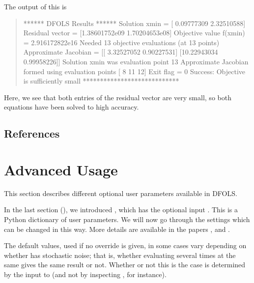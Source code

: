 \documentclass[letterpaper,10pt,english]{sphinxmanual}
\begin{document}
\sphinxAtStartPar
The output of this is
\begin{quote}

\begin{sphinxVerbatim}[commandchars=\\\{\}]
****** DFO\PYGZhy{}LS Results ******
Solution xmin = [ 0.09777309 \PYGZhy{}2.32510588]
Residual vector = [\PYGZhy{}1.38601752e\PYGZhy{}09 \PYGZhy{}1.70204653e\PYGZhy{}08]
Objective value f(xmin) = 2.916172822e\PYGZhy{}16
Needed 13 objective evaluations (at 13 points)
Approximate Jacobian = [[ 3.32527052  0.90227531]
 [10.22943034 \PYGZhy{}0.99958226]]
Solution xmin was evaluation point 13
Approximate Jacobian formed using evaluation points [ 8 11 12]
Exit flag = 0
Success: Objective is sufficiently small
****************************
\end{sphinxVerbatim}
\end{quote}

\sphinxAtStartPar
Here, we see that both entries of the residual vector are very small, so both equations have been solved to high accuracy.


\section{References}
\label{\detokenize{userguide:references}}
\sphinxstepscope


\chapter{Advanced Usage}
\label{\detokenize{advanced:advanced-usage}}\label{\detokenize{advanced::doc}}
\sphinxAtStartPar
This section describes different optional user parameters available in DFO\sphinxhyphen{}LS.

\sphinxAtStartPar
In the last section ({\hyperref[\detokenize{userguide::doc}]{}}), we introduced , which has the optional input . This is a Python dictionary of user parameters. We will now go through the settings which can be changed in this way. More details are available in the papers ,  and .

\sphinxAtStartPar
The default values, used if no override is given, in some cases vary depending on whether  has stochastic noise; that is, whether evaluating  several times at the same  gives the same result or not. Whether or not this is the case is determined by the  input to  (and not by inspecting , for instance).
\end{document}

